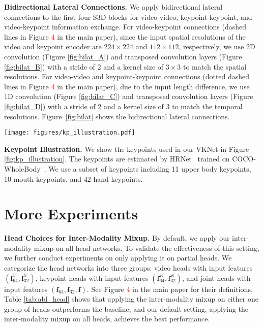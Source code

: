 \documentclass[10pt,twocolumn,letterpaper]{article}
\def \tbf{\textbf}
\begin{document}
\noindent\textbf{Bidirectional Lateral Connections.}
We apply bidirectional lateral connections \cite{duan2022revisiting} to the first four S3D blocks for video-video, keypoint-keypoint, and video-keypoint information exchange.
For video-keypoint connections (dashed lines in Figure \textcolor{red}{4} in the main paper), since the input spatial resolutions of the video and keypoint encoder are $224\times224$ and $112\times112$, respectively, we use 2D convolution (Figure \ref{fig:bilat_A}) and transposed convolution layers (Figure \ref{fig:bilat_B}) with a stride of 2 and a kernel size of $3\times3$ to match the spatial resolutions.
For video-video and keypoint-keypoint connections (dotted dashed lines in Figure \textcolor{red}{4} in the main paper), due to the input length difference, we use 1D convolution (Figure \ref{fig:bilat_C}) and transposed convolution layers (Figure \ref{fig:bilat_D}) with a stride of 2 and a kernel size of 3 to match the temporal resolutions. Figure~\ref{fig:bilat} shows the bidirectional lateral connections.

\begin{figure*}[t]
\centering
\texttt{[image: figures/kp\_illustration.pdf]}
\caption{Illustration of the keypoints (11 upper body keypoints, 10 mouth keypoints, and 42 hand keypoints) used in our VKNet.}
\label{fig:kp_illustration}
\end{figure*}

\noindent\textbf{Keypoint Illustration.} We show the keypoints used in our VKNet in Figure \ref{fig:kp_illustration}. The keypoints are estimated by HRNet~\cite{sun2019deep} trained on COCO-WholeBody~\cite{jin2020whole}.
We use a subset of keypoints including 11 upper body keypoints, 10 mouth keypoints, and 42 hand keypoints.


\section{More Experiments}
\noindent\tbf{Head Choices for Inter-Modality Mixup.}
By default, we apply our inter-modality mixup on all head networks.
To validate the effectiveness of this setting, we further conduct experiments on only applying it on partial heads.
We categorize the head networks into three groups: video heads with input features $(\boldsymbol{f}_{64}^V, \boldsymbol{f}_{32}^V)$, keypoint heads with input features $(\boldsymbol{f}_{64}^K, \boldsymbol{f}_{32}^K)$, and joint heads with input features $(\boldsymbol{f}_{64}, \boldsymbol{f}_{32}, \boldsymbol{f})$. See Figure \textcolor{red}{4} in the main paper for their definitions.
Table \ref{tab:abl_head} shows that applying the inter-modality mixup on either one group of heads outperforms the baseline, and our default setting, applying the inter-modality mixup on all heads, achieves the best performance.
\end{document}

